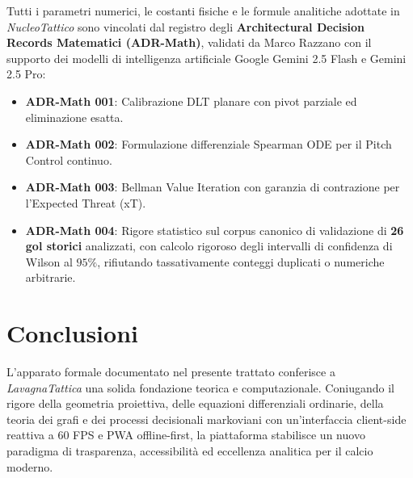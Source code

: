 \documentclass[11pt,a4paper]{article}
\begin{document}
Tutti i parametri numerici, le costanti fisiche e le formule analitiche adottate in \textsl{NucleoTattico} sono vincolati dal registro degli \textbf{Architectural Decision Records Matematici (ADR-Math)}, validati da Marco Razzano con il supporto dei modelli di intelligenza artificiale Google Gemini 2.5 Flash e Gemini 2.5 Pro:
\begin{itemize}
    \item \textbf{ADR-Math 001}: Calibrazione DLT planare con pivot parziale ed eliminazione esatta.
    \item \textbf{ADR-Math 002}: Formulazione differenziale Spearman ODE per il Pitch Control continuo.
    \item \textbf{ADR-Math 003}: Bellman Value Iteration con garanzia di contrazione per l'Expected Threat (xT).
    \item \textbf{ADR-Math 004}: Rigore statistico sul corpus canonico di validazione di \textbf{26 gol storici} analizzati, con calcolo rigoroso degli intervalli di confidenza di Wilson al $95\%$, rifiutando tassativamente conteggi duplicati o numeriche arbitrarie.
\end{itemize}


\section{Conclusioni}

L'apparato formale documentato nel presente trattato conferisce a \textsl{LavagnaTattica} una solida fondazione teorica e computazionale. Coniugando il rigore della geometria proiettiva, delle equazioni differenziali ordinarie, della teoria dei grafi e dei processi decisionali markoviani con un'interfaccia client-side reattiva a 60 FPS e PWA offline-first, la piattaforma stabilisce un nuovo paradigma di trasparenza, accessibilità ed eccellenza analitica per il calcio moderno.
\end{document}
